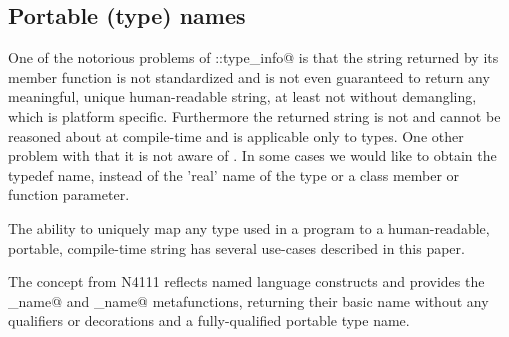 \subsection{Portable (type) names}

One of the notorious problems of \verb@std::type_info@ is that the string
returned by its \verb@name@ member function is not standardized and is
not even guaranteed to return any meaningful, unique human-readable string,
at least not without demangling, which is platform specific.
Furthermore the returned string is not \verb@constexpr@ and cannot be
reasoned about at compile-time and is applicable only to types.
One other problem with \verb@typeid@ that it is not aware of \verb@typedef@s.
In some cases we would like to obtain the typedef name, instead of the
'real' name of the type or a class member or function parameter.

The ability to uniquely map any type used in a program to a human-readable,
portable, compile-time string has several use-cases described in this paper.

The  concept from N4111 reflects named language constructs
and provides the \verb@base_name@ and \verb@full_name@ metafunctions,
returning their basic name without any qualifiers or decorations and a fully-qualified 
portable type name.

